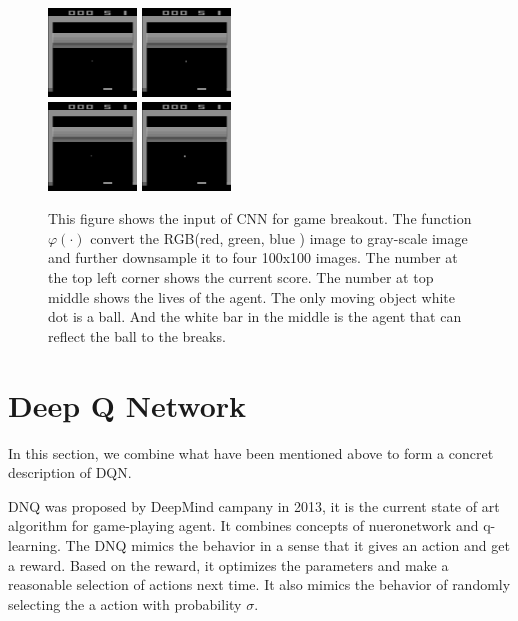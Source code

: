 \documentclass{article}
\begin{document}
\begin{figure}[h!]
\centering
{\includegraphics[width = 0.21\textwidth]{test_input_0}} 
{\includegraphics[width = 0.21\textwidth]{test_input_1}}\\ 
{\includegraphics[width = 0.21\textwidth]{test_input_2}}
{\includegraphics[width = 0.21\textwidth]{test_input_3}} 
\caption{This figure shows the input of CNN for game breakout. The function $\varphi(\cdot)$ convert the RGB(red, green, blue ) image to gray-scale image and further downsample it to four 100x100 images. The number at the top left corner shows the current score. The number at top middle shows the lives of the agent. The only moving object white dot is a ball. And the white bar in the middle is the agent that can reflect the ball to the breaks.}\label{function_output}
\end{figure}

\section{Deep Q Network}

In this section, we combine what have been mentioned above to form a concret description of DQN.

DNQ was proposed by DeepMind campany in 2013, it is the current state of art algorithm for game-playing agent. It combines concepts of nueronetwork and q-learning. The DNQ mimics the behavior in a sense that it gives an action and get a reward. Based on the reward, it optimizes the parameters and make a reasonable selection of actions next time. It also mimics the behavior of randomly selecting the a action with probability $\sigma$.
\end{document}
